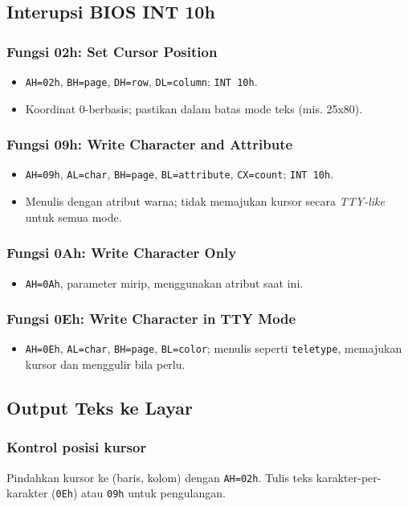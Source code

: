 \subsection{Interupsi BIOS INT 10h}
\subsubsection{Fungsi 02h: Set Cursor Position}
\begin{itemize}
  \item \texttt{AH=02h}, \texttt{BH=page}, \texttt{DH=row}, \texttt{DL=column}; \texttt{INT 10h}.
  \item Koordinat 0-berbasis; pastikan dalam batas mode teks (mis. 25x80).
\end{itemize}
\subsubsection{Fungsi 09h: Write Character and Attribute}
\begin{itemize}
  \item \texttt{AH=09h}, \texttt{AL=char}, \texttt{BH=page}, \texttt{BL=attribute}, \texttt{CX=count}; \texttt{INT 10h}.
  \item Menulis dengan atribut warna; tidak memajukan kursor secara \textit{TTY-like} untuk semua mode.
\end{itemize}
\subsubsection{Fungsi 0Ah: Write Character Only}
\begin{itemize}
  \item \texttt{AH=0Ah}, parameter mirip, menggunakan atribut saat ini.
\end{itemize}
\subsubsection{Fungsi 0Eh: Write Character in TTY Mode}
\begin{itemize}
  \item \texttt{AH=0Eh}, \texttt{AL=char}, \texttt{BH=page}, \texttt{BL=color}; menulis seperti \texttt{teletype}, memajukan kursor dan menggulir bila perlu.
\end{itemize}

\subsection{Output Teks ke Layar}
\subsubsection{Kontrol posisi kursor}
Pindahkan kursor ke (baris, kolom) dengan \texttt{AH=02h}. Tulis teks karakter-per-karakter (\texttt{0Eh}) atau \texttt{09h} untuk pengulangan.


